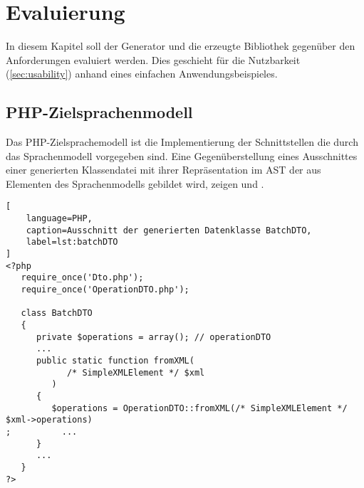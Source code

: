 \chapter{Evaluierung}
\label{chap:evaluation}


In diesem Kapitel soll der Generator und die erzeugte Bibliothek gegenüber den Anforderungen evaluiert werden. Dies geschieht für die Nutzbarkeit (\cref{sec:usability}) anhand eines einfachen Anwendungsbeispieles.

\section{PHP-Zielsprachenmodell}
\label{sec:php_target_language_model}

Das PHP-Zielsprachemodell ist die Implementierung der Schnittstellen die durch das Sprachenmodell vorgegeben sind.
Eine Gegenüberstellung eines Ausschnittes einer generierten Klassendatei mit ihrer Repräsentation im \gls{AST} der aus Elementen des Sprachenmodells gebildet wird, zeigen  und .

\begin{minipage}{\textwidth}
\begin{lstlisting}[
    language=PHP,
    caption=Ausschnitt der generierten Datenklasse BatchDTO,
    label=lst:batchDTO
]
<?php
   require_once('Dto.php');
   require_once('OperationDTO.php');

   class BatchDTO
   {
      private $operations = array(); // operationDTO 
      ...
      public static function fromXML(
            /* SimpleXMLElement */ $xml
         )
      {
         $operations = OperationDTO::fromXML(/* SimpleXMLElement */ $xml->operations)
;          ...
      }
      ...
   }
?>
\end{lstlisting}
\end{minipage}

\begin{sidewaysfigure}
    \centering
    \resizebox{\textwidth}{!}{
      
    }
    \caption{Darstellung von BatchDTO aus  im Sprachenmodell [\textbf{Klasse}, \emph{Zeichenkette}]}
    \label{fig:modelRepresentationOfBatchDTO}
\end{sidewaysfigure}

